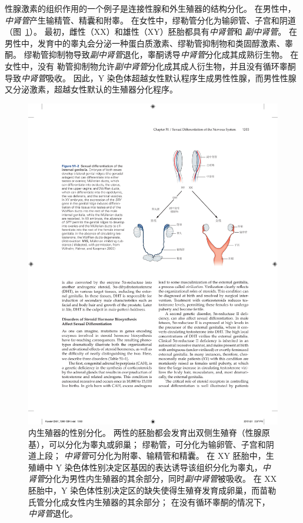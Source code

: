 性腺激素的组织作用的一个例子是连接性腺和外生殖器的结构分化。
在男性中，\textit{中肾管}产生输精管、精囊和附睾。
在女性中，缪勒管分化为输卵管、子宫和阴道（图~\ref{fig:51_2}）。
最初，雌性（XX）和雄性（XY）胚胎都具有\textit{中肾管}和 \textit{副中肾管}。
在男性中，发育中的睾丸会分泌一种蛋白质激素、缪勒管抑制物和类固醇激素、睾酮。
缪勒管抑制物导致\textit{副中肾管}退化，睾酮诱导\textit{中肾管}分化成其成熟衍生物。
在女性中，没有 勒管抑制物允许\textit{副中肾管}分化成其成人衍生物，并且没有循环睾酮导致\textit{中肾管}吸收。
因此，Y 染色体超越女性默认程序生成男性性腺，而男性性腺又分泌激素，超越女性默认的生殖器分化程序。


\begin{figure}[htbp]
	\centering
	\includegraphics[width=0.77\linewidth]{chap51/fig_51_2}
	\caption{内生殖器的性别分化。
		两性的胚胎都会发育出双侧生殖脊（性腺原基），可以分化为睾丸或卵巢； 缪勒管，可分化为输卵管、子宫和阴道上段；
		\textit{中肾管}可分化为附睾、输精管和精囊。
		在 XY 胚胎中，生殖嵴中 Y 染色体性别决定区基因的表达诱导该组织分化为睾丸，\textit{中肾管}分化为男性内生殖器的其余部分，同时\textit{副中肾管}被吸收。
		在 XX 胚胎中，Y 染色体性别决定区的缺失使得生殖脊发育成卵巢，而苗勒氏管分化成女性内生殖器的其余部分；
		在没有循环睾酮的情况下，\textit{中肾管}退化\cite{wilhelm2007sex}。}
	\label{fig:51_2}
\end{figure}


